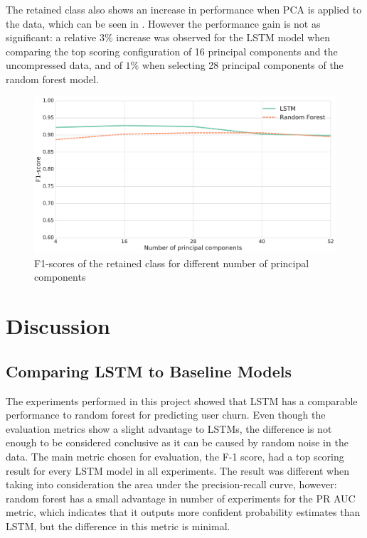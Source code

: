 \documentclass{kththesis}
\begin{document}
The retained class also shows an increase in performance when PCA is applied to the data, which can be seen in . However the performance gain is not as significant: a relative $3\%$ increase was observed for the LSTM model when comparing the top scoring configuration of 16 principal components and the uncompressed data, and of $1\%$ when selecting 28 principal components of the random forest model.  


\begin{figure}[H]
    \centering
    \includegraphics[width=1.0\textwidth,keepaspectratio]{figures/line_dim_reduction_retained.pdf}
    \caption{F1-scores of the retained class for different number of principal components}
    \label{fig:line_dim_reduction_ret}
\end{figure}


\chapter{Discussion}
\label{cha:discussion}

\section{Comparing LSTM to Baseline Models}
\label{sec:dis_lstm_baseline}

The experiments performed in this project showed that LSTM has a comparable performance to random forest for predicting user churn. Even though the evaluation metrics show a slight advantage to LSTMs, the difference is not enough to be considered conclusive as it can be caused by random noise in the data. The main metric chosen for evaluation, the F-1 score, had a top scoring result for every LSTM model in all experiments. The result was different when taking into consideration the area under the precision-recall curve, however: random forest has a small advantage in number of experiments for the PR AUC metric, which indicates that it outputs more confident probability estimates than LSTM, but the difference in this metric is minimal. 
\end{document}
